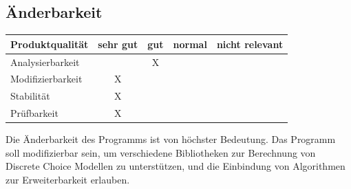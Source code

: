 \documentclass{article}
\begin{document}
\subsection{Änderbarkeit}
\begin{table}[H]
\centering
\begin{tabular}{lcccc}
\hline
\textbf{Produktqualität} & sehr gut & gut & normal & nicht relevant \\ \hline
Analysierbarkeit         &          & X   &        &                \\
Modifizierbarkeit        & X        &     &        &                \\
Stabilität               & X        &     &        &                \\
Prüfbarkeit              & X        &     &        &                \\
\end{tabular}
\end{table}
Die Änderbarkeit des Programms ist von höchster Bedeutung. Das Programm soll modifizierbar sein, um verschiedene Bibliotheken zur Berechnung von Discrete Choice Modellen zu unterstützen, und die Einbindung von Algorithmen zur Erweiterbarkeit erlauben.


\clearpage

\glsaddall
\printglossary[%
]
\end{document}
